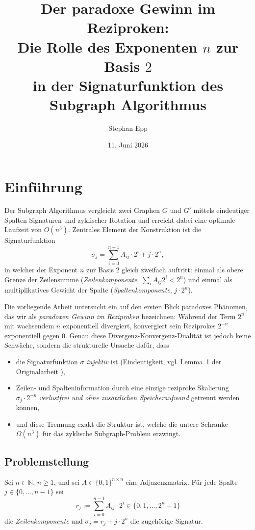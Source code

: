 ﻿\documentclass[a4paper,12pt]{article}
\title{Der paradoxe Gewinn im Reziproken:\\
Die Rolle des Exponenten $n$ zur Basis $2$\\
in der Signaturfunktion des Subgraph Algorithmus}
\author{Stephan Epp}
\date{11. Juni 2026}
\theoremstyle{definition}
\begin{document}
\maketitle

\tableofcontents
\newpage

\section{Einführung}

Der Subgraph Algorithmus vergleicht zwei Graphen $G$ und $G'$ mittels eindeutiger
Spalten-Signaturen und zyklischer Rotation und erreicht dabei eine optimale
Laufzeit von $O(n^3)$. Zentrales Element der Konstruktion ist die Signaturfunktion
\[
	\sigma_j = \sum_{i=0}^{n-1} A_{ij} \cdot 2^i + j \cdot 2^n,
\]
in welcher der Exponent $n$ zur Basis $2$ gleich zweifach auftritt: einmal als
obere Grenze der Zeilensumme (\emph{Zeilenkomponente}, $\sum_i A_{ij}2^i < 2^n$)
und einmal als multiplikatives Gewicht der Spalte (\emph{Spaltenkomponente},
$j \cdot 2^n$).

Die vorliegende Arbeit untersucht ein auf den ersten Blick paradoxes Phänomen,
das wir als \emph{paradoxen Gewinn im Reziproken} bezeichnen: Während der
Term $2^n$ mit wachsendem $n$ exponentiell divergiert, konvergiert sein
Reziprokes $2^{-n}$ exponentiell gegen $0$. Genau diese Divergenz-Konvergenz-Dualität
ist jedoch keine Schwäche, sondern die strukturelle Ursache dafür, dass
\begin{itemize}
	\item die Signaturfunktion $\sigma$ \emph{injektiv} ist (Eindeutigkeit, vgl.
	      Lemma~1 der Originalarbeit \cite{epp2026subgraph}),
	\item Zeilen- und Spalteninformation durch eine einzige reziproke Skalierung
	      $\sigma_j \cdot 2^{-n}$ \emph{verlustfrei und ohne zusätzlichen Speicheraufwand}
	      getrennt werden können,
	\item und diese Trennung exakt die Struktur ist, welche die untere
	      Schranke $\Omega(n^3)$ für das zyklische Subgraph-Problem erzwingt.
\end{itemize}

\subsection{Problemstellung}

Sei $n \in \mathbb{N}$, $n \geq 1$, und sei $A \in \{0,1\}^{n \times n}$ eine
Adjazenzmatrix. Für jede Spalte $j \in \{0,\ldots,n-1\}$ sei
\[
	r_j := \sum_{i=0}^{n-1} A_{ij} \cdot 2^i \in \{0, 1, \ldots, 2^n - 1\}
\]
die \emph{Zeilenkomponente} und $\sigma_j = r_j + j \cdot 2^n$ die zugehörige
Signatur.
\end{document}
